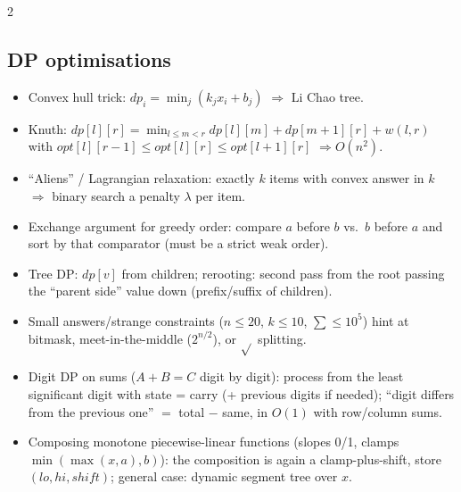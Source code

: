 \documentclass[8pt,a4paper]{extarticle}
\begin{document}
\begin{multicols*}{2}
\subsection{DP optimisations}
\begin{itemize}
\item Convex hull trick: $dp_i=\min_j(k_j x_i+b_j)$ $\Rightarrow$ Li Chao tree.
\item Knuth: $dp[l][r]=\min_{l\le m<r} dp[l][m]+dp[m+1][r]+w(l,r)$ with
  $opt[l][r-1]\le opt[l][r]\le opt[l+1][r]$ $\Rightarrow O(n^2)$.
\item ``Aliens'' / Lagrangian relaxation: exactly $k$ items with convex
  answer in $k$ $\Rightarrow$ binary search a penalty $\lambda$ per item.
\item Exchange argument for greedy order: compare $a$ before $b$ vs.\ $b$
  before $a$ and sort by that comparator (must be a strict weak order).
\item Tree DP: $dp[v]$ from children; rerooting: second pass from the root
  passing the ``parent side'' value down (prefix/suffix of children).
\item Small answers/strange constraints ($n\le 20$, $k\le 10$, $\sum\le 10^5$)
  hint at bitmask, meet-in-the-middle ($2^{n/2}$), or $\sqrt{}$ splitting.
\item Digit DP on sums ($A+B=C$ digit by digit): process from the least
  significant digit with state = carry (+ previous digits if needed);
  ``digit differs from the previous one'' $=$ total $-$ same, in $O(1)$
  with row/column sums.
\item Composing monotone piecewise-linear functions (slopes 0/1, clamps
  $\min(\max(x,a),b)$): the composition is again a clamp-plus-shift, store
  $(lo, hi, shift)$; general case: dynamic segment tree over $x$.
\end{itemize}

\end{multicols*}
\end{document}

